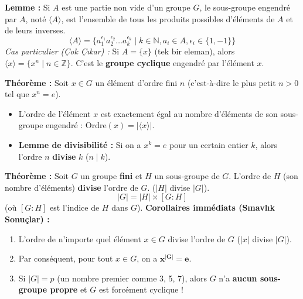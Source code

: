 \documentclass[12pt,a4paper]{report}
\begin{document}
\begin{tcolorbox}[colback=purple!5!white,colframe=purple!75!black,title=Lemme 1 : Forme des éléments de $\langle A \rangle$ (Üreteç Kümesinin İçi)]
\textbf{Lemme :} Si $A$ est une partie non vide d'un groupe $G$, le sous-groupe engendré par $A$, noté $\langle A \rangle$, est l'ensemble de tous les produits possibles d'éléments de $A$ et de leurs inverses.
\[ \langle A \rangle = \{ a_1^{\epsilon_1} a_2^{\epsilon_2} \dots a_k^{\epsilon_k} \mid k \in \mathbb{N}, a_i \in A, \epsilon_i \in \{1, -1\} \} \]
\textit{Cas particulier (Çok Çıkar) :} Si $A = \{x\}$ (tek bir eleman), alors $\langle x \rangle = \{ x^n \mid n \in \mathbb{Z} \}$. C'est le \textbf{groupe cyclique} engendré par l'élément $x$.
\end{tcolorbox}

\begin{tcolorbox}[colback=yellow!5!white,colframe=orange!80!black,title=Proposition 4 : Ordre d'un élément et divisibilité]
\textbf{Théorème :} Soit $x \in G$ un élément d'ordre fini $n$ (c'est-à-dire le plus petit $n > 0$ tel que $x^n = e$).
\begin{itemize}
    \item L'ordre de l'élément $x$ est exactement égal au nombre d'éléments de son sous-groupe engendré : $\text{Ordre}(x) = |\langle x \rangle|$.
    \item \textbf{Lemme de divisibilité :} Si on a $x^k = e$ pour un certain entier $k$, alors l'ordre $n$ \textbf{divise} $k$ ($n \mid k$).
\end{itemize}
\end{tcolorbox}

\begin{tcolorbox}[colback=teal!5!white,colframe=teal!80!black,title=Théorème de Lagrange (Le Boss Final des Sous-groupes)]
\textbf{Théorème :} Soit $G$ un groupe \textbf{fini} et $H$ un sous-groupe de $G$. L'ordre de $H$ (son nombre d'éléments) \textbf{divise} l'ordre de $G$. ($|H|$ divise $|G|$).
\[ |G| = |H| \times [G : H] \]
(où $[G : H]$ est l'indice de $H$ dans $G$).
\textbf{Corollaires immédiats (Sınavlık Sonuçlar) :}
\begin{enumerate}
    \item L'ordre de n'importe quel élément $x \in G$ divise l'ordre de $G$ ($|x|$ divise $|G|$).
    \item Par conséquent, pour tout $x \in G$, on a $\mathbf{x^{|G|} = e}$.
    \item Si $|G| = p$ (un nombre premier comme 3, 5, 7), alors $G$ n'a \textbf{aucun sous-groupe propre} et $G$ est forcément cyclique !
\end{enumerate}
\end{tcolorbox}
\end{document}
